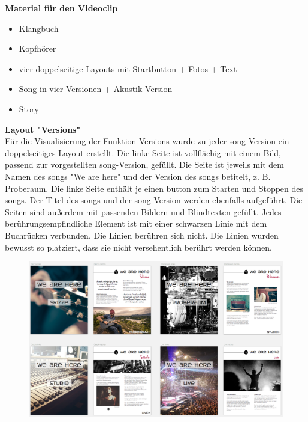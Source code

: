 \textbf{Material für den Videoclip}
\begin{itemize}
\item Klangbuch
\item Kopfhörer
\item vier doppelseitige Layouts mit Startbutton + Fotos + Text
\item Song in vier Versionen + Akustik Version
\item Story
\end{itemize}

\vspace{0.5cm}



\textbf{Layout "Versions"}\\
Für die Visualisierung der Funktion Versions wurde zu jeder \gls{song}-Version ein doppelseitiges Layout erstellt. Die linke Seite ist vollflächig mit einem Bild, passend zur vorgestellten \gls{song}-Version, gefüllt. Die Seite ist jeweils mit dem Namen des \gls{song}s "We are here" und der Version des \gls{song}s betitelt, z. B. Proberaum. Die linke Seite enthält je einen \gls{button} zum Starten und Stoppen des \gls{song}s. Der Titel des \gls{song}s und der \gls{song}-Version werden ebenfalls aufgeführt. Die Seiten sind außerdem mit passenden Bildern und Blindtexten gefüllt. Jedes berührungsempfindliche Element ist mit einer schwarzen Linie mit dem Buchrücken verbunden. Die Linien berühren sich nicht. Die Linien wurden bewusst so platziert, dass sie nicht versehentlich berührt werden können.

\begin{figure}[H]
\centering
\includegraphics[width=1.0\textwidth]{grafiken/songversions.png}
\caption{}
\end{figure}

